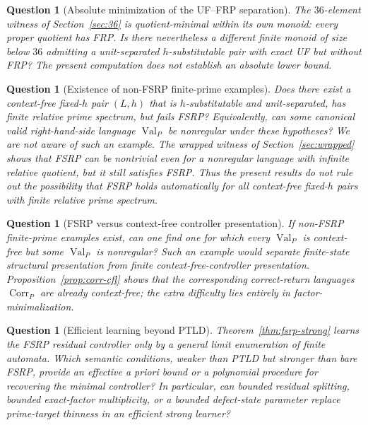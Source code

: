\documentclass[11pt,a4paper]{article}
\newtheorem{question}[theorem]{Question}
\newcommand{\Val}{\operatorname{Val}}
\newcommand{\Corr}{\operatorname{Corr}}
\begin{document}
\begin{question}[Absolute minimization of the UF--FRP separation]
The $36$-element witness of Section~\ref{sec:36} is quotient-minimal within its own monoid: every proper quotient has FRP.  Is there nevertheless a different finite monoid of size below $36$ admitting a unit-separated $h$-substitutable pair with exact UF but without FRP?  The present computation does not establish an absolute lower bound.
\end{question}

\begin{question}[Existence of non-FSRP finite-prime examples]
Does there exist a context-free fixed-$h$ pair $(L,h)$ that is $h$-substitutable and unit-separated, has finite relative prime spectrum, but fails FSRP?  Equivalently, can some canonical valid right-hand-side language $\Val_P$ be nonregular under these hypotheses?  We are not aware of such an example.  The wrapped witness of Section~\ref{sec:wrapped} shows that FSRP can be nontrivial even for a nonregular language with infinite relative quotient, but it still satisfies FSRP.  Thus the present results do not rule out the possibility that FSRP holds automatically for all context-free fixed-$h$ pairs with finite relative prime spectrum.
\end{question}

\begin{question}[FSRP versus context-free controller presentation]
If non-FSRP finite-prime examples exist, can one find one for which every $\Val_P$ is context-free but some $\Val_P$ is nonregular?  Such an example would separate finite-state structural presentation from finite context-free-controller presentation.  Proposition~\ref{prop:corr-cfl} shows that the corresponding correct-return languages $\Corr_P$ are already context-free; the extra difficulty lies entirely in factor-minimalization.
\end{question}

\begin{question}[Efficient learning beyond PTLD]
Theorem~\ref{thm:fsrp-strong} learns the FSRP residual controller only by a general limit enumeration of finite automata.  Which semantic conditions, weaker than PTLD but stronger than bare FSRP, provide an effective a priori bound or a polynomial procedure for recovering the minimal controller?  In particular, can bounded residual splitting, bounded exact-factor multiplicity, or a bounded defect-state parameter replace prime-target thinness in an efficient strong learner?
\end{question}
\end{document}
